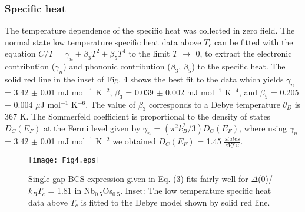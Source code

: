 \documentclass[reprint, superscriptaddress, secnumarabic, amssymb, nobibnotes, aps, prl]{revtex4-1}
\begin{document}
 \subsubsection{Specific heat}
The temperature dependence of the specific heat was collected in zero field. The normal state low temperature specific heat data above $T_{c}$ can be fitted with the equation $C/T$ = $\gamma_{n}+\beta_{3}T^{2}+\beta_{5}T^{4}$ to the limit $\textit{T}$ $\to$ 0, to extract the electronic contribution ($\gamma_{n}$) and phononic contribution ($\beta_{3}$, $\beta_{5}$) to the specific heat. The solid red line in the inset of Fig. 4 shows the best fit to the data which yields $\gamma_{n}$ = 3.42 $\pm$ 0.01 mJ mol$^{-1}$ K$^{-2}$, $\beta_{3}$ = 0.039 $\pm$ 0.002 mJ mol$^{-1}$ K$^{-4}$, and $\beta_{5}$ = 0.205 $\pm$ 0.004 $\mu$J mol$^{-1}$ K$^{-6}$. The value of $\beta_{3}$ corresponds to a Debye temperature $\theta_{D}$ is 367 K. The Sommerfeld coefficient is proportional to the density of states $D_{C}(E_{F})$ at the Fermi level given by $\gamma_{n}$ = $(\pi^{2}k_{B}^{2}/3)D_{C}(E_{F})$, where using $\gamma_{n}$ = 3.42 $\pm$ 0.01 mJ mol$^{-1}$ K$^{-2}$ we obtained $D_{C}(E_{F})$ = 1.45 $\frac{states}{eV f.u}$.\\

\begin{figure}
\texttt{[image: Fig4.eps]}
\caption{\label{Fig4:hc2} Single-gap BCS expression given in Eq. (3) fits fairly well for $\Delta$(0)/$k_{B}T_{c}$ = 1.81 in Nb$_{0.5}$Os$_{0.5}$. Inset: The low temperature specific heat data above $T_{c}$ is fitted to the Debye model shown by solid red line.}
\end{figure}
 
\end{document}
